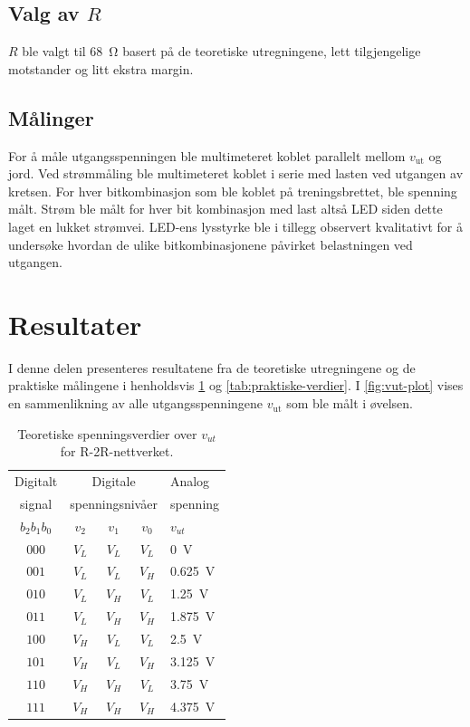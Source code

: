 \documentclass[11pt,a4paper,twocolumn]{article}
\begin{document}
\subsection{Valg av $R$}
$R$ ble valgt til \qty{68}{\ohm} basert på de teoretiske utregningene, lett tilgjengelige motstander og litt ekstra margin.

\subsection{Målinger}
For å måle utgangsspenningen ble multimeteret koblet parallelt mellom \(v_{\mathrm{ut}}\) og jord. Ved strømmåling ble multimeteret koblet i serie med lasten ved utgangen av kretsen. For hver bitkombinasjon som ble koblet på treningsbrettet, ble spenning målt. Strøm ble målt for hver bit kombinasjon med last altså LED siden dette laget en lukket strømvei. LED-ens lysstyrke ble i tillegg observert kvalitativt for å undersøke hvordan de ulike bitkombinasjonene påvirket belastningen ved utgangen.

\section{Resultater}
I denne delen presenteres resultatene fra de teoretiske utregningene og de praktiske målingene i henholdsvis \cref{tab:teoretiske-spenningsverdier} og \cref{tab:praktiske-verdier}. I \cref{fig:vut-plot} vises en sammenlikning av alle utgangsspenningene \(v_{\mathrm{ut}}\) som ble målt i øvelsen. 

\begin{table}
\centering
\begin{center}
	\begin{tabular}{c|ccc|l}
		Digitalt & \multicolumn{3}{c|}{Digitale } & Analog \\ [-0.2cm]
		signal & \multicolumn{3}{c|}{spenningsnivåer} & spenning \\
		$b_2b_1b_0$ & $v_2$ & $v_1$ & $v_0$ & $v_{ut}$ \\
		\hline
		$000$ & $V_L$ & $V_L$ & $V_L$ & \qty{0}{\volt} \\
		$001$ & $V_L$ & $V_L$ & $V_H$ & \qty{0.625}{\volt} \\
		$010$ & $V_L$ & $V_H$ & $V_L$ & \qty{1.25}{\volt} \\
		$011$ & $V_L$ & $V_H$ & $V_H$ & \qty{1.875}{\volt} \\
		$100$ & $V_H$ & $V_L$ & $V_L$ & \qty{2.5}{\volt} \\
		$101$ & $V_H$ & $V_L$ & $V_H$ & \qty{3.125}{\volt} \\
		$110$ & $V_H$ & $V_H$ & $V_L$ & \qty{3.75}{\volt} \\
		$111$ & $V_H$ & $V_H$ & $V_H$ & \qty{4.375}{\volt} \\
	\end{tabular}
\end{center}
\caption{Teoretiske spenningsverdier over $v_{ut}$ for R-2R-nettverket.}
\label{tab:teoretiske-spenningsverdier}
\end{table}
\end{document}
